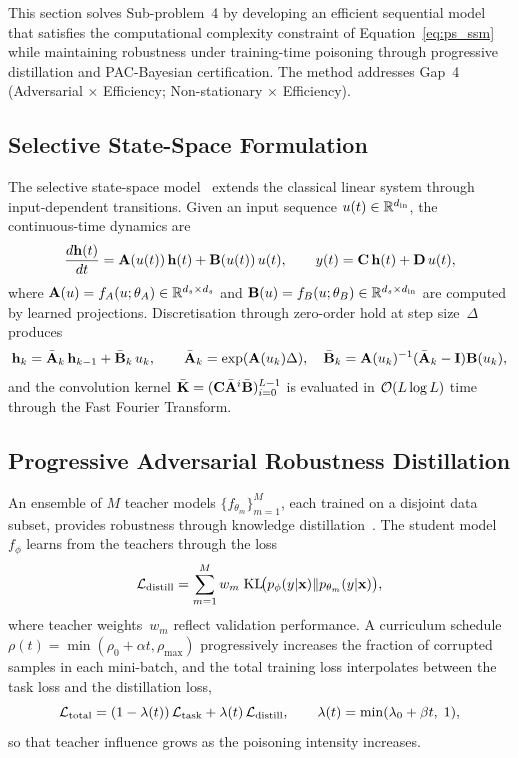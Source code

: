 This section solves Sub-problem~4 by developing an efficient sequential model that satisfies the computational complexity constraint of Equation~\eqref{eq:ps_ssm} while maintaining robustness under training-time poisoning through progressive distillation and PAC-Bayesian certification. The method addresses Gap~4 (Adversarial $\times$ Efficiency; Non-stationary $\times$ Efficiency).

\subsection{Selective State-Space Formulation}

The selective state-space model~\cite{Gu2022,Gu2024} extends the classical linear system through input-dependent transitions. Given an input sequence $u(t)\in\mathbb{R}^{d_{\mathrm{in}}}$, the continuous-time dynamics are
\begin{equation}
\frac{d\mathbf{h}(t)}{dt} = \mathbf{A}(u(t))\,\mathbf{h}(t) + \mathbf{B}(u(t))\,u(t),
\qquad
y(t) = \mathbf{C}\,\mathbf{h}(t) + \mathbf{D}\,u(t),
\label{eq:mamba_cts}
\end{equation}
where $\mathbf{A}(u)=f_A(u;\theta_A)\in\mathbb{R}^{d_s\times d_s}$ and $\mathbf{B}(u)=f_B(u;\theta_B)\in\mathbb{R}^{d_s\times d_{\mathrm{in}}}$ are computed by learned projections. Discretisation through zero-order hold at step size~$\Delta$ produces
\begin{equation}
\mathbf{h}_k = \bar{\mathbf{A}}_k\,\mathbf{h}_{k-1} + \bar{\mathbf{B}}_k\,u_k,
\qquad
\bar{\mathbf{A}}_k = \exp(\mathbf{A}(u_k)\Delta),
\quad
\bar{\mathbf{B}}_k = \mathbf{A}(u_k)^{-1}(\bar{\mathbf{A}}_k - \mathbf{I})\mathbf{B}(u_k),
\label{eq:mamba_disc}
\end{equation}
and the convolution kernel $\bar{\mathbf{K}}=(\mathbf{C}\bar{\mathbf{A}}^i\bar{\mathbf{B}})_{i=0}^{L-1}$ is evaluated in $\mathcal{O}(L\log L)$ time through the Fast Fourier Transform.

\subsection{Progressive Adversarial Robustness Distillation}

An ensemble of $M$ teacher models $\{f_{\theta_m}\}_{m=1}^M$, each trained on a disjoint data subset, provides robustness through knowledge distillation~\cite{Hinton2015,Xie2019}. The student model~$f_\phi$ learns from the teachers through the loss
\begin{equation}
\mathcal{L}_{\mathrm{distill}}
= \sum_{m=1}^{M}w_m\;\mathrm{KL}\!\bigl(p_\phi(y|\mathbf{x})\|p_{\theta_m}(y|\mathbf{x})\bigr),
\label{eq:mamba_distill}
\end{equation}
where teacher weights~$w_m$ reflect validation performance. A curriculum schedule $\rho(t)=\min(\rho_0+\alpha t,\rho_{\max})$ progressively increases the fraction of corrupted samples in each mini-batch, and the total training loss interpolates between the task loss and the distillation loss,
\begin{equation}
\mathcal{L}_{\mathrm{total}}
= (1-\lambda(t))\,\mathcal{L}_{\mathrm{task}}
+ \lambda(t)\,\mathcal{L}_{\mathrm{distill}},
\qquad
\lambda(t) = \min(\lambda_0+\beta t,\;1),
\label{eq:mamba_curriculum}
\end{equation}so that teacher influence grows as the poisoning intensity increases.

